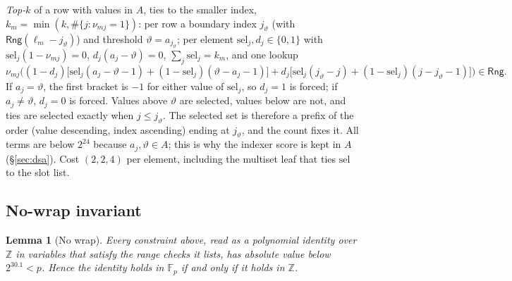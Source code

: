 \documentclass[11pt]{article}
\newcommand{\F}{\mathbb{F}}
\newcommand{\Z}{\mathbb{Z}}
\newcommand{\Rng}{\mathsf{Rng}}
\newcommand{\Fp}{\F_p}
\newtheorem{lemma}{Lemma}
\begin{document}
\emph{Top-\(k\)} of a row with values in \(A\), ties to the smaller index, \(k_m = \min(k, \#\{j : \nu_{mj} = 1\})\): per row a boundary index \(j_\vartheta\) (with \(\Rng(\ell_m - j_\vartheta)\)) and threshold \(\vartheta = a_{j_\vartheta}\); per element \(\mathrm{sel}_j, d_j \in \{0,1\}\) with \(\mathrm{sel}_j(1 - \nu_{mj}) = 0\), \(d_j(a_j - \vartheta) = 0\), \(\sum_j \mathrm{sel}_j = k_m\), and one lookup
\[
\nu_{mj}\Big((1 - d_j)\big[\mathrm{sel}_j(a_j - \vartheta - 1) + (1 - \mathrm{sel}_j)(\vartheta - a_j - 1)\big] + d_j\big[\mathrm{sel}_j(j_\vartheta - j) + (1 - \mathrm{sel}_j)(j - j_\vartheta - 1)\big]\Big) \in \Rng.
\]
If \(a_j = \vartheta\), the first bracket is \(-1\) for either value of \(\mathrm{sel}_j\), so \(d_j = 1\) is forced; if \(a_j \ne \vartheta\), \(d_j = 0\) is forced.
Values above \(\vartheta\) are selected, values below are not, and ties are selected exactly when \(j \le j_\vartheta\).
The selected set is therefore a prefix of the order (value descending, index ascending) ending at \(j_\vartheta\), and the count fixes it.
All terms are below \(2^{24}\) because \(a_j, \vartheta \in A\); this is why the indexer score is kept in \(A\) (\S\ref{sec:dsa}).
Cost \((2, 2, 4)\) per element, including the multiset leaf that ties \(\mathrm{sel}\) to the slot list.

\subsection{No-wrap invariant}

\begin{lemma}[No wrap]
\label{lem:nowrap}
Every constraint above, read as a polynomial identity over \(\Z\) in variables that satisfy the range checks it lists, has absolute value below \(2^{30.1} < p\).
Hence the identity holds in \(\Fp\) if and only if it holds in \(\Z\).
\end{lemma}
\end{document}
